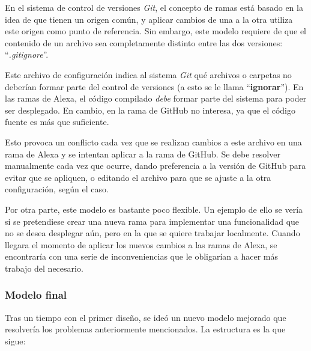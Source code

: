 \documentclass[11pt,spanish,listoffigures,listoftables,table,hyphens,dvipsnames]{tfgetsinf}
\begin{document}
En el sistema de control de versiones \emph{Git}, el concepto de ramas está basado en la idea de que tienen un origen común, y aplicar cambios de una a la otra utiliza este origen como punto de referencia. Sin embargo, este modelo requiere de que el contenido de un archivo sea completamente distinto entre las dos versiones: ``\emph{.gitignore}''.

Este archivo de configuración indica al sistema \emph{Git} qué archivos o carpetas no deberían formar parte del control de versiones (a esto se le llama ``\textbf{ignorar}''). En las ramas de Alexa, el código compilado \emph{debe} formar parte del sistema para poder ser desplegado. En cambio, en la rama de GitHub no interesa, ya que el código fuente es más que suficiente.

Esto provoca un conflicto cada vez que se realizan cambios a este archivo en una rama de Alexa y se intentan aplicar a la rama de GitHub. Se debe resolver manualmente cada vez que ocurre, dando preferencia a la versión de GitHub para evitar que se apliquen, o editando el archivo para que se ajuste a la otra configuración, según el caso.

Por otra parte, este modelo es bastante poco flexible. Un ejemplo de ello se vería si se pretendiese crear una nueva rama para implementar una funcionalidad que no se desea desplegar aún, pero en la que se quiere trabajar localmente. Cuando llegara el momento de aplicar los nuevos cambios a las ramas de Alexa, se encontraría con una serie de inconveniencias que le obligarían a hacer más trabajo del necesario.

\subsubsection{Modelo final}

Tras un tiempo con el primer diseño, se ideó un nuevo modelo mejorado que resolvería los problemas anteriormente mencionados. La estructura es la que sigue:
\end{document}
